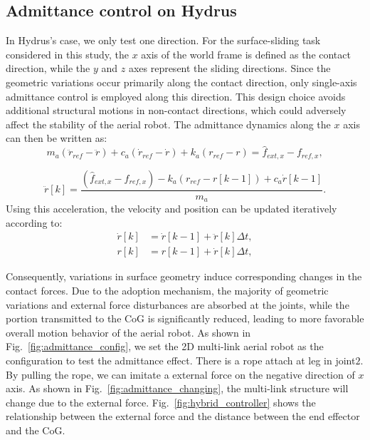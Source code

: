 \subsection{Admittance control on Hydrus}
In Hydrus's case, we only test one direction. For the surface-sliding task considered in this study, the $x$ axis of the world frame is defined as the contact direction, while the $y$ and $z$ axes represent the sliding directions. Since the geometric variations occur primarily along the contact direction, only single-axis admittance control is employed along this direction. This design choice avoids additional structural motions in non-contact directions, which could adversely affect the stability of the aerial robot. The admittance dynamics along the $x$ axis can then be written as: 
\begin{equation}
\label{eq:admittance control2}
    m_a(\ddot{r}_{ref}-\ddot{r})+c_a(\dot{r}_{ref}-\dot{r})+k_a(r_{ref}-r)=\hat{f}_{ext,x}-f_{ref,x},
\end{equation}

\begin{equation}
\label{eq:difference method1}
\ddot{r}[k]=\frac{(\hat{f}_{ext,x}-f_{ref,x})-k_a(r_{ref}-r[k-1])+c_a\dot{r}[k-1]}{m_a}.
\end{equation}
Using this acceleration, the velocity and position can be updated iteratively according to:
\begin{subequations}
\label{eq:difference method2}
\begin{align}
\dot{r}[k]&=\dot{r}[k-1]+\ddot{r}[k]\Delta t, \\[2pt]
r[k]&=r[k-1]+\dot{r}[k]\Delta t,
\end{align}
\end{subequations}

Consequently, variations in surface geometry induce corresponding changes in the contact forces. Due to the adoption mechanism,  the majority of geometric variations and external force disturbances are absorbed at the joints, while the portion transmitted to the CoG is significantly reduced, leading to more favorable overall motion behavior of the aerial robot.
As shown in Fig.~\ref{fig:admittance_config}, we set the 2D multi-link aerial robot as the configuration to test the admittance effect. There is a rope attach at leg in joint$2$. By pulling the rope, we can imitate a external force on the negative direction of $x$ axis. As shown in Fig.~\ref{fig:admittance_changing}, the multi-link structure will change due to the external force. Fig.~\ref{fig:hybrid_controller} shows the relationship between the external force and the distance between the end effector and the CoG.



